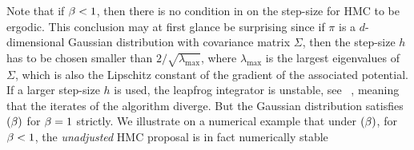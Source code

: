 Note that if $\beta < 1$, then there is no condition in
 on the step-size for HMC to be ergodic. This
conclusion may at first glance be surprising since if $\pi$ is a
$d$-dimensional Gaussian distribution with covariance matrix $\Sigma$,
then the step-size $h$ has to be chosen smaller than
$2/\sqrt{\lambda_{\mathrm{max}}}$, where $\lambda_{\mathrm{max}}$ is
the largest eigenvalues of $\Sigma$, which is also the Lipschitz
constant of the gradient of the associated potential. If a larger
step-size $h$ is used, the leapfrog integrator is unstable, see
\eg~\cite[Example 3.4, Proposition 3.1]{bou-rabee:sanz-serna:2018},
meaning that the iterates of the algorithm diverge. But the Gaussian
distribution satisfies $(\beta)$ for
$\beta=1$ strictly.
We illustrate on a numerical example that under $(\beta)$, for $\beta <1$,
  the \textit{unadjusted} HMC proposal is in fact numerically stable

